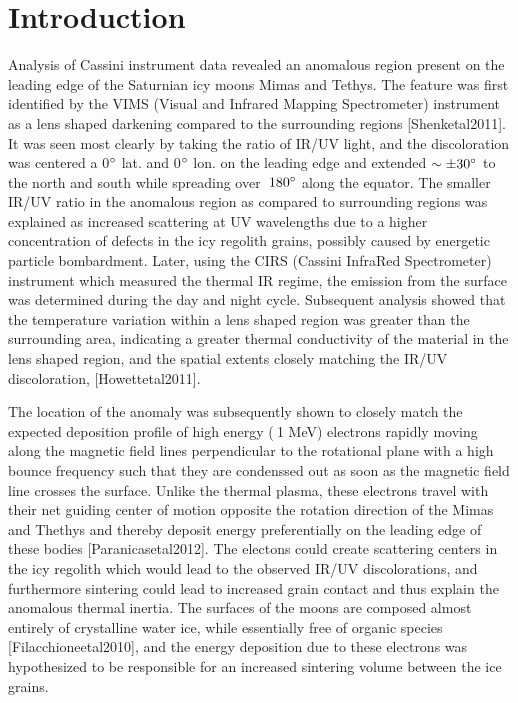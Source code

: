 \documentclass[11pt]{article} %
\begin{document}
\newpage
\section{Introduction}
\label{sec:intro}

	Analysis of Cassini instrument data revealed an anomalous region present on the leading edge of the Saturnian icy moons Mimas and Tethys. The feature was first identified by the VIMS (Visual and Infrared Mapping Spectrometer) instrument as a lens shaped darkening compared to the surrounding regions [Shenketal2011]. It was seen most clearly by taking the ratio of IR/UV light, and the discoloration was centered a 0$\degree$ lat. and 0$\degree$ lon. on the leading edge and extended $\sim \pm30\degree$ to the north and south while spreading over $\>180 \degree$ along the equator. The smaller IR/UV ratio in the anomalous region as compared to surrounding regions was explained as increased scattering at UV wavelengths due to a higher concentration of defects in the icy regolith grains, possibly caused by energetic particle bombardment. Later, using the CIRS (Cassini InfraRed Spectrometer) instrument which measured the thermal IR regime, the emission from the surface was determined during the day and night cycle. Subsequent analysis showed that the temperature variation within a lens shaped region was greater than the surrounding area, indicating a greater thermal conductivity of the material in the lens shaped region, and the spatial extents closely matching the IR/UV discoloration,  [Howettetal2011]. 

	The location of the anomaly was subsequently shown to closely match the expected deposition profile of high energy ($\>$1 MeV) electrons rapidly moving along the magnetic field lines perpendicular to the rotational plane with a high bounce frequency such that they are condenssed out as soon as the magnetic field line crosses the surface. Unlike the thermal plasma, these electrons travel with their net guiding center of motion opposite the rotation direction of the Mimas and Thethys and thereby deposit energy preferentially on the leading edge of these bodies [Paranicasetal2012]. The electons could create scattering centers in the icy regolith which would lead to the observed IR/UV discolorations, and furthermore sintering could lead to increased grain contact and thus explain the anomalous thermal inertia.  The surfaces of the moons are composed almost entirely of crystalline water ice, while essentially free of organic species [Filacchioneetal2010], and the energy deposition due to these electrons was hypothesized to be responsible for an increased sintering volume between the ice grains.
\end{document}
